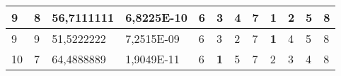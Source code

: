 \documentclass[conference]{IEEEtran}
\begin{document}
\begin{table*}[]
\begin{tabular}{|llll|llllllll|}
\multicolumn{1}{|l|}{9}                                                     & \multicolumn{1}{l|}{8}                                                        & \multicolumn{1}{l|}{56,7111111}                                                   & 6,8225E-10                     & \multicolumn{1}{l|}{6}                                                  & \multicolumn{1}{l|}{3}                                                  & \multicolumn{1}{l|}{4}                                                  & \multicolumn{1}{l|}{7}                                                  & \multicolumn{1}{l|}{\textbf{1}}                                         & \multicolumn{1}{l|}{2}                                                  & \multicolumn{1}{l|}{5}                                                  & 8                          \\ \hline
\multicolumn{1}{|l|}{9}                                                     & \multicolumn{1}{l|}{9}                                                        & \multicolumn{1}{l|}{51,5222222}                                                   & 7,2515E-09                     & \multicolumn{1}{l|}{6}                                                  & \multicolumn{1}{l|}{3}                                                  & \multicolumn{1}{l|}{2}                                                  & \multicolumn{1}{l|}{7}                                                  & \multicolumn{1}{l|}{\textbf{1}}                                         & \multicolumn{1}{l|}{4}                                                  & \multicolumn{1}{l|}{5}                                                  & 8                          \\ \hline
\multicolumn{1}{|l|}{10}                                                    & \multicolumn{1}{l|}{7}                                                        & \multicolumn{1}{l|}{64,4888889}                                                   & 1,9049E-11                     & \multicolumn{1}{l|}{6}                                                  & \multicolumn{1}{l|}{\textbf{1}}                                         & \multicolumn{1}{l|}{5}                                                  & \multicolumn{1}{l|}{7}                                                  & \multicolumn{1}{l|}{2}                                                  & \multicolumn{1}{l|}{3}                                                  & \multicolumn{1}{l|}{4}                                                  & 8                          \\ \hline

\end{tabular}
\end{table*}
\end{document}
